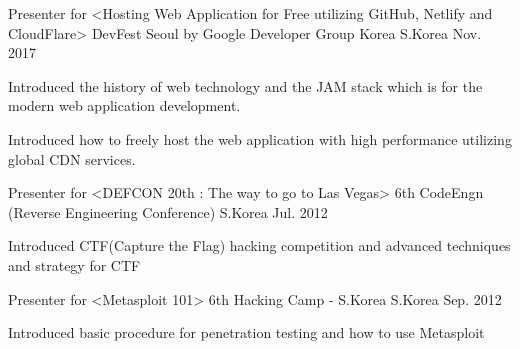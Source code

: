 

\begin{cventries}

  \cventry
    {Presenter for <Hosting Web Application for Free utilizing GitHub, Netlify and CloudFlare>} %
    {DevFest Seoul by Google Developer Group Korea} %
    {S.Korea} %
    {Nov. 2017} %
    {
      \begin{cvitems} %
        \item {Introduced the history of web technology and the JAM stack which is for the modern web application development.}
        \item {Introduced how to freely host the web application with high performance utilizing global CDN services.}
      \end{cvitems}
    }

  \cventry
    {Presenter for <DEFCON 20th : The way to go to Las Vegas>} %
    {6th CodeEngn (Reverse Engineering Conference)} %
    {S.Korea} %
    {Jul. 2012} %
    {
      \begin{cvitems} %
        \item {Introduced CTF(Capture the Flag) hacking competition and advanced techniques and strategy for CTF}
      \end{cvitems}
    }

  \cventry
    {Presenter for <Metasploit 101>} %
    {6th Hacking Camp - S.Korea} %
    {S.Korea} %
    {Sep. 2012} %
    {
      \begin{cvitems} %
        \item {Introduced basic procedure for penetration testing and how to use Metasploit}
      \end{cvitems}
    }

\end{cventries}
